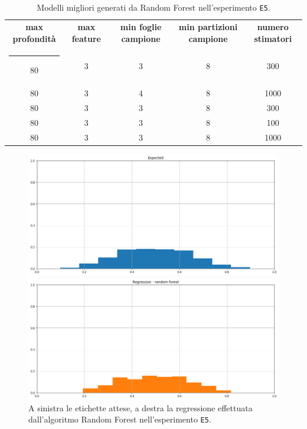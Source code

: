 \documentclass[12pt]{report}
\makeatletter
\theoremstyle{definition}
\newcommand{\thickhline}{%
    \noalign {\ifnum 0=`}\fi \hrule height 1pt
    \futurelet \reserved@a \@xhline
}
\makeatother
\begin{document}
\begin{table}
\centering
\begin{adjustbox}{max width=\textwidth}
 \begin{tabular}{|c|c|c|c|c|} 
 \hline
\textbf{max profondità} & \textbf{max feature} & \textbf{min foglie campione} & \textbf{min partizioni campione} & \textbf{numero stimatori}
\\ [0.5ex] 
 \thickhline
 80 & 3 & 3 & 8 & 300 \\ 
 80 & 3 & 4 & 8 & 1000 \\ 
 80 & 3 & 3 & 8 & 300 \\ 
 80 & 3 & 3 & 8 & 100 \\ 
 80 & 3 & 3 & 8 & 1000 \\ 
 \hline
\end{tabular}
\end{adjustbox}
\caption{Modelli migliori generati da Random Forest nell'esperimento \texttt{E5}.}
\label{models_rf_exp5}
\end{table}

\begin{figure}
\centering
    \begin{minipage}{0.48\textwidth}
        \includegraphics[width=\linewidth]{images/experiment_beta5_sovrapposti/expected_memberships.png}
    \end{minipage}
    \begin{minipage}{0.48\textwidth}
        \includegraphics[width=\linewidth]{images/experiment_beta5_sovrapposti/prediction_regression_rf.png}
    \end{minipage}
    \caption{A sinistra le etichette attese, a destra la regressione effettuata dall'algoritmo Random Forest nell'esperimento \texttt{E5}.}
    \label{rf_exp5}
\end{figure} 
\end{document}
